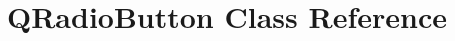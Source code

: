\hypertarget{classGUI_1_1QtGui_1_1QRadioButton}{}\section{Q\+Radio\+Button Class Reference}
\label{classGUI_1_1QtGui_1_1QRadioButton}
